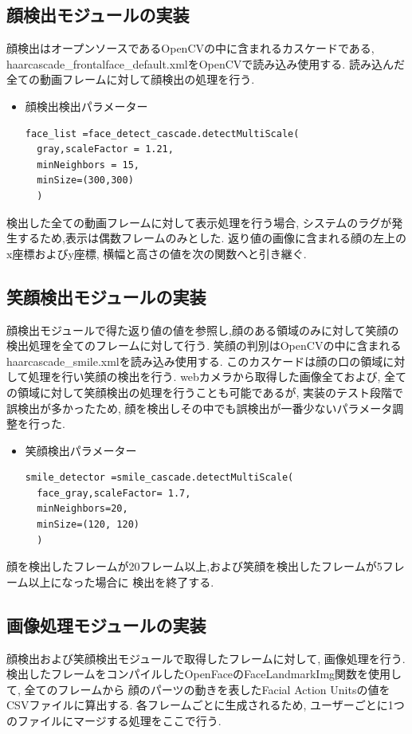 \subsection{顔検出モジュールの実装}
顔検出はオープンソースであるOpenCVの中に含まれるカスケードである,
haarcascade\_frontalface\_default.xmlをOpenCVで読み込み使用する.
読み込んだ全ての動画フレームに対して顔検出の処理を行う.
\begin{itemize}
\item 顔検出検出パラメーター
\begin{lstlisting}
face_list =face_detect_cascade.detectMultiScale(
  gray,scaleFactor = 1.21,
  minNeighbors = 15,
  minSize=(300,300)
  )
\end{lstlisting}
\end{itemize}
検出した全ての動画フレームに対して表示処理を行う場合, システムのラグが発生するため,表示は偶数フレームのみとした.
返り値の画像に含まれる顔の左上のx座標およびy座標, 横幅と高さの値を次の関数へと引き継ぐ.

\subsection{笑顔検出モジュールの実装}
顔検出モジュールで得た返り値の値を参照し,顔のある領域のみに対して笑顔の検出処理を全てのフレームに対して行う.
笑顔の判別はOpenCVの中に含まれるhaarcascade\_smile.xmlを読み込み使用する.
このカスケードは顔の口の領域に対して処理を行い笑顔の検出を行う.
webカメラから取得した画像全ておよび, 全ての領域に対して笑顔検出の処理を行うことも可能であるが,
実装のテスト段階で誤検出が多かったため, 顔を検出しその中でも誤検出が一番少ないパラメータ調整を行った.

\begin{itemize}
\item 笑顔検出パラメーター
\begin{lstlisting}
smile_detector =smile_cascade.detectMultiScale(
  face_gray,scaleFactor= 1.7,
  minNeighbors=20,
  minSize=(120, 120)
  )
\end{lstlisting}
\end{itemize}

顔を検出したフレームが20フレーム以上,および笑顔を検出したフレームが5フレーム以上になった場合に
検出を終了する.

\subsection{画像処理モジュールの実装}
顔検出および笑顔検出モジュールで取得したフレームに対して, 画像処理を行う.
検出したフレームをコンパイルしたOpenFaceのFaceLandmarkImg関数を使用して, 全てのフレームから
顔のパーツの動きを表したFacial Action Unitsの値をCSVファイルに算出する.
各フレームごとに生成されるため, ユーザーごとに1つのファイルにマージする処理をここで行う.

